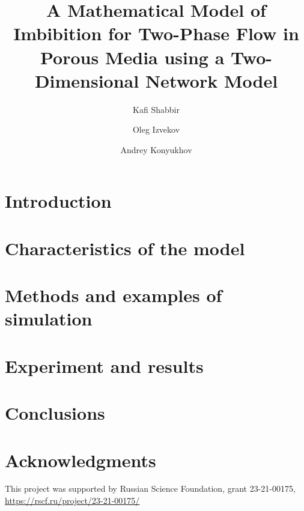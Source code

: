 \documentclass[
	12pt
] {article}
\title{A Mathematical Model of Imbibition for Two-Phase Flow in Porous Media using a Two-Dimensional Network Model}
\author[1]{Kafi Shabbir}
\author[1]{Oleg Izvekov}
\author[1]{Andrey Konyukhov}
\affil[1]{Moscow Institute of Physics and Technology}
\begin{document}
	\nocite{*}
	\maketitle
	
	\begin{abstract}
		
	\end{abstract}
		
	\section{Introduction} \label{sec:intro}
		
		
	\section{Characteristics of the model} \label{sec:model}
		
		
	\section{Methods and examples of simulation} \label{sec:computation}
		

	\section{Experiment and results} \label{sec:experiment}
		

	\section{Conclusions} \label{sec:conclusion}
		
		
	\section{Acknowledgments}
		This project was supported by Russian Science Foundation, grant 23-21-00175, \url{https://rscf.ru/project/23-21-00175/}
		
	
	
		
\end{document}
